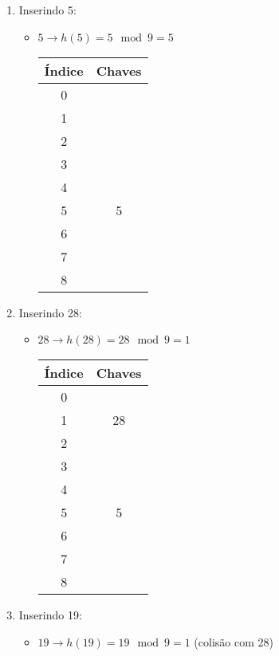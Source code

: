 \documentclass{article}
\begin{document}
\begin{enumerate}
  \item Inserindo 5:
    \begin{itemize}
      \item \(5 \rightarrow h(5) = 5 \mod 9 = 5\)
          
      \begin{center}
        \begin{tabular}{|c|c|}
        \hline
        \textbf{Índice} & \textbf{Chaves} \\
        \hline
        0 &  \\
        1 &  \\
        2 & \\
        3 & \\
        4 &  \\
        5 & 5 \\
        6 & \\
        7 &  \\
        8 & \\
        \hline
        \end{tabular}
      \end{center}
    \end{itemize}
  \item Inserindo 28:
    \begin{itemize}
      \item \(28 \rightarrow h(28) = 28 \mod 9 = 1\)
          
      \begin{center}
        \begin{tabular}{|c|c|}
        \hline
        \textbf{Índice} & \textbf{Chaves} \\
        \hline
        0 &  \\
        1 & 28 \\
        2 & \\
        3 & \\
        4 &  \\
        5 & 5 \\
        6 & \\
        7 &  \\
        8 & \\
        \hline
        \end{tabular}
      \end{center}
    \end{itemize}
  \item Inserindo 19:
    \begin{itemize}
      \item \(19 \rightarrow h(19) = 19 \mod 9 = 1\) (colisão com 28)
          

\end{itemize}
\end{enumerate}
\end{document}
